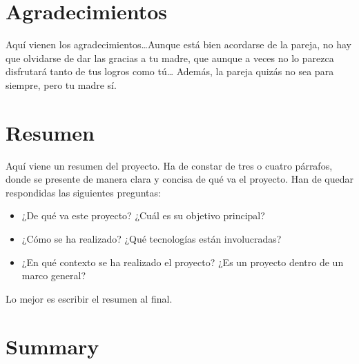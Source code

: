 \documentclass[a4paper, 12pt]{book}
\begin{document}

\chapter*{Agradecimientos}

Aquí vienen los agradecimientos\ldots Aunque está bien acordarse de la pareja, no hay que olvidarse de dar las gracias a tu madre, que aunque a veces no lo parezca disfrutará tanto de tus logros como tú\ldots 
Además, la pareja quizás no sea para siempre, pero tu madre sí.


\chapter*{Resumen}

Aquí viene un resumen del proyecto.
Ha de constar de tres o cuatro párrafos, donde se presente de manera clara y concisa de qué va el proyecto. 
Han de quedar respondidas las siguientes preguntas:

\begin{itemize}
  \item ¿De qué va este proyecto? ¿Cuál es su objetivo principal?
  \item ¿Cómo se ha realizado? ¿Qué tecnologías están involucradas?
  \item ¿En qué contexto se ha realizado el proyecto? ¿Es un proyecto dentro de un marco general?
\end{itemize}

Lo mejor es escribir el resumen al final.


\chapter*{Summary}
\end{document}
